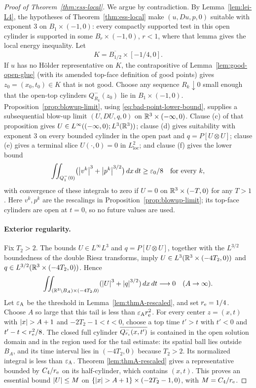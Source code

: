 \documentclass[11pt,letterpaper]{article}
\numberwithin{equation}{section}
\theoremstyle{plain}
\theoremstyle{definition}
\theoremstyle{remark}
\begin{document}
\begin{proof}[Proof of Theorem~\ref{thm:ess-local}]
We argue by contradiction. By Lemma~\ref{lem:lei-L4}, the hypotheses of
Theorem~\ref{thm:ess-local} make $(u,Du,p,0)$ suitable with exponent $3$
on $B_1\times(-1,0)$: every compactly supported test in this open cylinder
is supported in some $B_r\times(-1,0)$, $r<1$, where that lemma gives the
local energy inequality. Let
\[
 K=\overline{B_{1/2}}\times[-1/4,0].
\]
If $u$ has no H\"older representative on $K$, the contrapositive of
Lemma~\ref{lem:good-open-glue} (with its amended top-face definition of
good points) gives $z_0=(x_0,t_0)\in K$ that is not good. Choose any
sequence $R_k\downarrow0$ small enough that the open-top cylinders
$Q^-_{R_k}(z_0)$ lie in $B_1\times(-1,0)$. Proposition~\ref{prop:blowup-limit}, using
\eqref{eq:bad-point-lower-bound}, supplies a subsequential blow-up limit
$(U,DU,q,0)$ on $\mathbb{R}^3\times(-\infty,0)$. Clause (c) of that
proposition gives $U\in L^\infty((-\infty,0);L^3(\mathbb{R}^3))$; clause (d) gives
suitability with exponent $3$ on every bounded cylinder in the open past and
$q=P[U\otimes U]$; clause (e) gives a terminal slice $U(\cdot,0)=0$ in
$L^2_{\mathrm{loc}}$; and clause (f) gives the lower bound
\[
 \iint_{Q_1^-(0)}\bigl(\left\lvert v^k\right\rvert^3+\left\lvert p^k\right\rvert^{3/2}\bigr)\,dx\,dt
       \ge\varepsilon_0/8\quad\text{for every }k,
\]
with convergence of these integrals to zero if $U=0$ on
$\mathbb{R}^3\times(-T,0)$ for any $T>1$. Here $v^k,p^k$ are the rescalings
in Proposition~\ref{prop:blowup-limit}; its top-face cylinders are open
at $t=0$, so no future values are used.

\paragraph{Exterior regularity.}
Fix $T_2>2$. The bounds $U\in L^\infty L^3$ and
$q=P[U\otimes U]$, together with the $L^{3/2}$ boundedness of the double
Riesz transforms, imply
$U\in L^3(\mathbb{R}^3\times(-4T_2,0))$ and
$q\in L^{3/2}(\mathbb{R}^3\times(-4T_2,0))$. Hence
\[
 \iint_{(\mathbb{R}^3\setminus B_A)\times(-4T_2,0)}
       (\left\lvert U\right\rvert^3+\left\lvert q\right\rvert^{3/2})\,dx\,dt\longrightarrow0
       \quad(A\to\infty).
\]
Let $\varepsilon_{\rm A}$ be the threshold in
Lemma~\ref{lem:thmA-rescaled}, and set $r_{\rm e}=1/4$. Choose $A$ so
large that this tail is less than $\varepsilon_{\rm A}r_{\rm e}^2$.
For every center $z=(x,t)$ with $\left\lvert x\right\rvert>A+1$ and
$-2T_2-1<t<0$, choose a top time $t'>t$ with
$t'<0$ and $t'-t<r_{\rm e}^2/8$. The closed full cylinder
$\overline{Q_{r_{\rm e}}^-(x,t')}$ is contained in the open solution domain
and in the region used for the tail estimate: its spatial ball lies outside
$B_A$, and its time interval lies in $(-4T_2,0)$ because $T_2>2$.
Its normalized integral is less than $\varepsilon_{\rm A}$. Theorem
\ref{lem:thmA-rescaled} gives a representative bounded by
$C_4/r_{\rm e}$ on its half-cylinder, which contains $(x,t)$. This proves
an essential bound $\left\lvert U\right\rvert\le M$ on
$\{\left\lvert x\right\rvert>A+1\}\times(-2T_2-1,0)$, with $M=C_4/r_{\rm e}$.


\end{proof}
\end{document}
